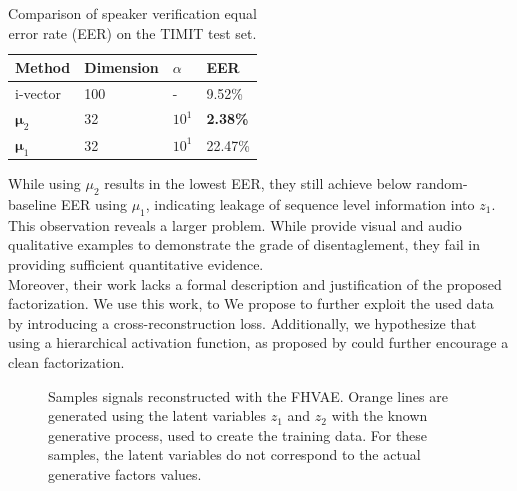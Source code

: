 \documentclass{article} %
\begin{document}
\begin{table}[tbh]
	\caption{Comparison of speaker verification equal error rate (EER) on the TIMIT test set.}
	\label{tab:eer}
	\centering
	\begin{tabular}{llll}
		\toprule
		Method 				& Dimension 	& $\alpha$ 		& EER  				 \\
		\midrule\midrule
		\multirow{1}{*}{i-vector}
		& 100   & -     & 9.52\%    \\
		\midrule
		\multirow{1}{*}{$\bm{\mu}_2$}  	& 32			& $10^1$	& \textbf{2.38\%}  	 	\\
		\midrule
		\multirow{1}{*}{$\bm{\mu}_1$}
	& 32			& $10^1$		& 22.47\%   	\\
		\bottomrule
	\end{tabular}
\end{table}
While using $\mu_2$ results in the lowest EER, they still achieve below random-baseline EER using $\mu_1$, indicating leakage of sequence level information into $z_1$.\\
This observation reveals a larger problem. While \citet{hsu2017unsupervised} provide visual and audio qualitative examples to demonstrate the grade of disentaglement, they fail in providing sufficient quantitative evidence.\\
Moreover, their work lacks a formal description and justification of the proposed factorization. We use this work, to 
We propose to further exploit the used data by introducing a cross-reconstruction loss.
 Additionally, we hypothesize that using a hierarchical activation function, as proposed by \citet{shen2018ordered} could further encourage a clean factorization.

\begin{figure}[t]\scriptsize
%
\centering
\caption{Samples signals reconstructed with the FHVAE. Orange lines are generated using the latent variables $z_1$ and $z_2$ with the known generative process, used to create the training data. For these samples, the latent variables do not correspond to the actual generative factors values.}
\end{figure}
%
%
%
%
%
%
\end{document}
